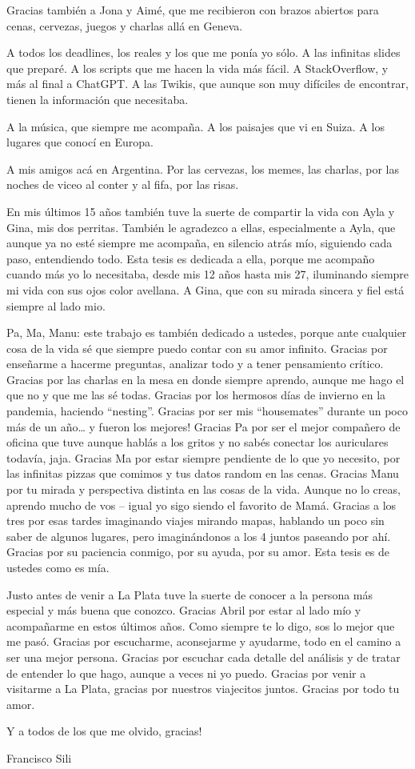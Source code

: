 Gracias también a Jona y Aimé, que me recibieron con brazos abiertos para cenas, cervezas, juegos y charlas allá en Geneva.

A todos los deadlines, los reales y los que me ponía yo sólo. A las infinitas slides que preparé. A los scripts que me hacen la vida más fácil. A StackOverflow, y más al final a ChatGPT. A las Twikis, que aunque son muy difíciles de encontrar, tienen la información que necesitaba.

A la música, que siempre me acompaña. A los paisajes que vi en Suiza. A los lugares que conocí en Europa.

A mis amigos acá en Argentina. Por las cervezas, los memes, las charlas, por las noches de viceo al conter y al fifa, por las risas.

En mis últimos 15 años también tuve la suerte de compartir la vida con Ayla y Gina, mis dos perritas. También le agradezco a ellas, especialmente a Ayla, que aunque ya no esté siempre me acompaña, en silencio atrás mío, siguiendo cada paso, entendiendo todo. Esta tesis es dedicada a ella, porque me acompaño cuando más yo lo necesitaba, desde mis 12 años hasta mis 27, iluminando siempre mi vida con sus ojos color avellana. A Gina, que con su mirada sincera y fiel está siempre al lado mio.

Pa, Ma, Manu: este trabajo es también dedicado a ustedes, porque ante cualquier cosa de la vida sé que siempre puedo contar con su amor infinito. Gracias por enseñarme a hacerme preguntas, analizar todo y a tener pensamiento crítico. Gracias por las charlas en la mesa en donde siempre aprendo, aunque me hago el que no y que me las sé todas. Gracias por los hermosos días de invierno en la pandemia, haciendo “nesting”. Gracias por ser mis “housemates” durante un poco más de un año… y fueron los mejores! Gracias Pa por ser el mejor compañero de oficina que tuve aunque hablás a los gritos y no sabés conectar los auriculares todavía, jaja. Gracias Ma por estar siempre pendiente de lo que yo necesito, por las infinitas pizzas que comimos y tus datos random en las cenas. Gracias Manu por tu mirada y perspectiva distinta en las cosas de la vida. Aunque no lo creas, aprendo mucho de vos -- igual yo sigo siendo el favorito de Mamá. Gracias a los tres por esas tardes imaginando viajes mirando mapas, hablando un poco sin saber de algunos lugares, pero imaginándonos a los 4 juntos paseando por ahí. Gracias por su paciencia conmigo, por su ayuda, por su amor. Esta tesis es de ustedes como es mía.

Justo antes de venir a La Plata tuve la suerte de conocer a la persona más especial y más buena que conozco. Gracias Abril por estar al lado mío y acompañarme en estos últimos años. Como siempre te lo digo, sos lo mejor que me pasó. Gracias por escucharme, aconsejarme y ayudarme, todo en el camino a ser una mejor persona. Gracias por escuchar cada detalle del análisis y de tratar de entender lo que hago, aunque a veces ni yo puedo. Gracias por venir a visitarme a La Plata, gracias por nuestros viajecitos juntos. Gracias por todo tu amor.

Y a todos de los que me olvido, gracias!



\medskip

{
	\begin{flushright}
		Francisco Sili
	\end{flushright}
}